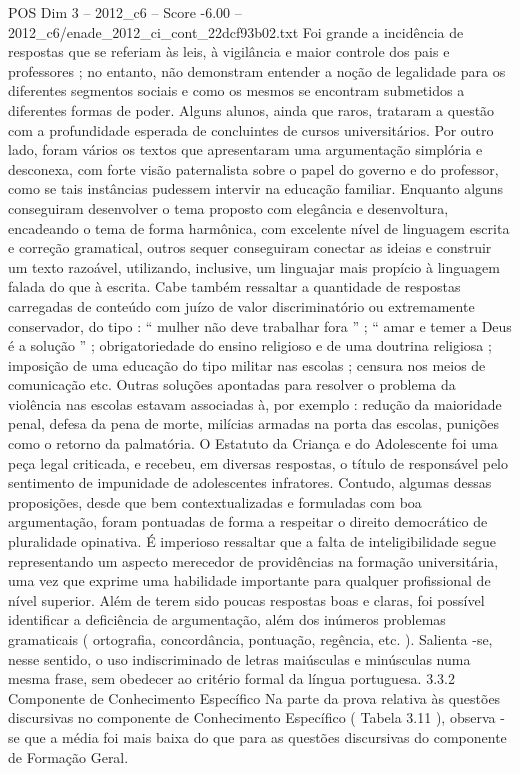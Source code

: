 \begin{textsample}{POS Dim 3 – 2012\_c6 – Score -6.00 – 2012\_c6/enade\_2012\_ci\_cont\_22dcf93b02.txt}
Foi grande a incidência de respostas que se referiam às leis, à vigilância e maior controle dos pais e professores ; no entanto, não demonstram entender a noção de legalidade para os diferentes segmentos sociais e como os mesmos se encontram submetidos a diferentes formas de poder.
Alguns alunos, ainda que raros, trataram a questão com a profundidade esperada de concluintes de cursos universitários.
Por outro lado, foram vários os textos que apresentaram uma argumentação simplória e desconexa, com forte visão paternalista sobre o papel do governo e do professor, como se tais instâncias pudessem intervir na educação familiar.
Enquanto alguns conseguiram desenvolver o tema proposto com elegância e desenvoltura, encadeando o tema de forma harmônica, com excelente nível de linguagem escrita e correção gramatical, outros sequer conseguiram conectar as ideias e construir um texto razoável, utilizando, inclusive, um linguajar mais propício à linguagem falada do que à escrita.
Cabe também ressaltar a quantidade de respostas carregadas de conteúdo com juízo de valor discriminatório ou extremamente conservador, do tipo : “ mulher não deve trabalhar fora ” ; “ amar e temer a Deus é a solução ” ; obrigatoriedade do ensino religioso e de uma doutrina religiosa ; imposição de uma educação do tipo militar nas escolas ; censura nos meios de comunicação etc.
Outras soluções apontadas para resolver o problema da violência nas escolas estavam associadas à, por exemplo : redução da maioridade penal, defesa da pena de morte, milícias armadas na porta das escolas, punições como o retorno da palmatória.
O Estatuto da Criança e do Adolescente foi uma peça legal criticada, e recebeu, em diversas respostas, o título de responsável pelo sentimento de impunidade de adolescentes infratores.
Contudo, algumas dessas proposições, desde que bem contextualizadas e formuladas com boa argumentação, foram pontuadas de forma a respeitar o direito democrático de pluralidade opinativa.
É imperioso ressaltar que a falta de inteligibilidade segue representando um aspecto merecedor de providências na formação universitária, uma vez que exprime uma habilidade importante para qualquer profissional de nível superior.
Além de terem sido poucas respostas boas e claras, foi possível identificar a deficiência de argumentação, além dos inúmeros problemas gramaticais ( ortografia, concordância, pontuação, regência, etc. ).
Salienta -se, nesse sentido, o uso indiscriminado de letras maiúsculas e minúsculas numa mesma frase, sem obedecer ao critério formal da língua portuguesa. 3.3.2 Componente de Conhecimento Específico Na parte da prova relativa às questões discursivas no componente de Conhecimento Específico ( Tabela 3.11 ), observa -se que a média foi mais baixa do que para as questões discursivas do componente de Formação Geral.

\end{textsample}
